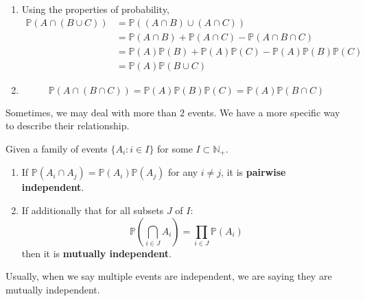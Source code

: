 \documentclass{huhtakm-template-book}
\newcommand{\prob}{\mathbb{P}}
\begin{document}
\begin{proofing}
	\begin{enumerate}
		\item Using the properties of probability,
		\begin{align*}
			\prob(A\cap(B\cup C))&=\prob((A\cap B)\cup(A\cap C))\\
			&=\prob(A\cap B)+\prob(A\cap C)-\prob(A\cap B\cap C)\\
			&=\prob(A)\prob(B)+\prob(A)\prob(C)-\prob(A)\prob(B)\prob(C)\\
			&=\prob(A)\prob(B\cup C)
		\end{align*}
		\item
		\begin{equation*}
			\prob(A\cap(B\cap C))=\prob(A)\prob(B)\prob(C)=\prob(A)\prob(B\cap C)
		\end{equation*}
	\end{enumerate}
\end{proofing}
Sometimes, we may deal with more than $2$ events. We have a more specific way to describe their relationship.
\begin{defn}
	Given a family of events $\{A_{i}:i\in I\}$ for some $I\subset\mathbb{N}_{+}$.
	\begin{enumerate}
		\item If $\prob(A_{i}\cap A_{j})=\prob(A_{i})\prob(A_{j})$ for any $i\neq j$, it is \textbf{pairwise independent}.
		\item If additionally that for all subsets $J$ of $I$:
		\begin{equation*}
			\prob\left(\bigcap_{i\in J}A_{i}\right)=\prod_{i\in J}\prob(A_{i})
		\end{equation*}
		then it is \textbf{mutually independent}.
	\end{enumerate}
\end{defn}
\begin{rem}
	Usually, when we say multiple events are independent, we are saying they are mutually independent.
\end{rem}
\end{document}
